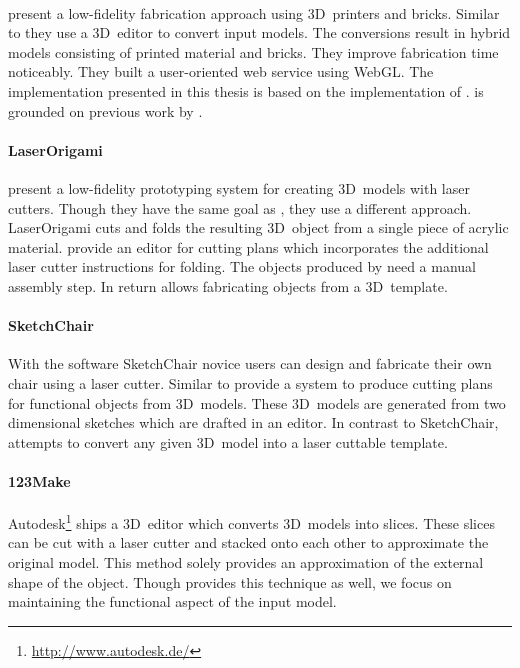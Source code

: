 \documentclass[../ClassicThesis.tex]{subfiles}
\begin{document}
\paragraph{{\brickify}} \citeauthor{bachelor-thesis} present
a low-fidelity fabrication approach using 3D~printers and
{\lego} bricks. Similar to {\platener} they
use a 3D~editor to convert input models. The conversions
result in hybrid models consisting of printed material and
bricks. They improve fabrication time noticeably. They built
a user-oriented web service using WebGL. The implementation
presented in this thesis is based on the implementation of
{\brickify}. {\brickify} is grounded on previous work by
\citeauthor{fabrickation}.


\paragraph{LaserOrigami} \citeauthor{laserorigami} present a
low-fidelity prototyping system for creating 3D~models with laser
cutters. Though they have the same goal as {\platener}, they use a
different approach. LaserOrigami cuts and folds the resulting
3D~object from a single piece of acrylic material.
\citeauthor{laserorigami} provide an editor for cutting plans which
incorporates the additional laser cutter instructions for folding. The
objects produced by {\platener} need a manual assembly step. In return
{\platener} allows fabricating objects from a 3D~template.


\paragraph{SketchChair} With the software SketchChair novice users can
design and fabricate their own chair using a laser cutter. Similar to
{\platener} \citeauthor{sketchchair} provide a system to produce
cutting plans for functional objects from 3D~models. These 3D~models
are generated from two dimensional sketches which are drafted in an
editor. In contrast to SketchChair, {\platener} attempts to convert
any given 3D~model into a laser cuttable template.


\paragraph{123Make} Autodesk\footnote{\url{http://www.autodesk.de/}}
ships a 3D~editor which converts 3D~models into slices. These slices
can be cut with a laser cutter and stacked onto each other to
approximate the original model. This method solely provides an
approximation of the external shape of the object. Though {\platener}
provides this technique as well, we focus on maintaining the
functional aspect of the input model.

\end{document}
